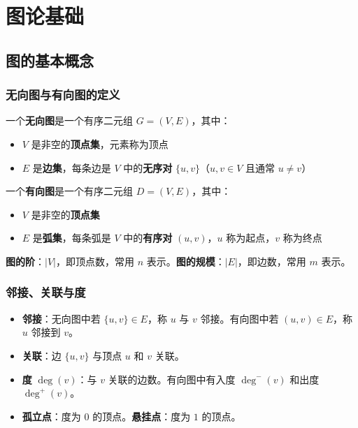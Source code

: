 \chapter{图论基础}

\section{图的基本概念}

\subsection{无向图与有向图的定义}

\begin{mydefinition}{}
一个\textbf{无向图}是一个有序二元组 $G = (V, E)$，其中：
\begin{itemize}
    \item $V$ 是非空的\textbf{顶点集}，元素称为顶点
    \item $E$ 是\textbf{边集}，每条边是 $V$ 中的\textbf{无序对} $\{u, v\}$（$u, v \in V$ 且通常 $u \neq v$）
\end{itemize}
\end{mydefinition}

\begin{mydefinition}{}
一个\textbf{有向图}是一个有序二元组 $D = (V, E)$，其中：
\begin{itemize}
    \item $V$ 是非空的\textbf{顶点集}
    \item $E$ 是\textbf{弧集}，每条弧是 $V$ 中的\textbf{有序对} $(u, v)$，$u$ 称为起点，$v$ 称为终点
\end{itemize}
\end{mydefinition}

\textbf{图的阶}：$|V|$，即顶点数，常用 $n$ 表示。\quad \textbf{图的规模}：$|E|$，即边数，常用 $m$ 表示。

\subsection{邻接、关联与度}

\begin{itemize}
    \item \textbf{邻接}：无向图中若 $\{u, v\} \in E$，称 $u$ 与 $v$ 邻接。有向图中若 $(u, v) \in E$，称 $u$ 邻接到 $v$。
    \item \textbf{关联}：边 $\{u, v\}$ 与顶点 $u$ 和 $v$ 关联。
    \item \textbf{度} $\deg(v)$：与 $v$ 关联的边数。有向图中有入度 $\deg^{-}(v)$ 和出度 $\deg^{+}(v)$。
    \item \textbf{孤立点}：度为 $0$ 的顶点。\textbf{悬挂点}：度为 $1$ 的顶点。
\end{itemize}

